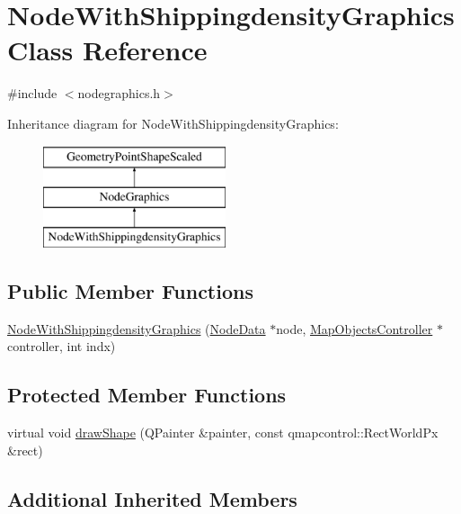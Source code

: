 \hypertarget{class_node_with_shippingdensity_graphics}{}\section{Node\+With\+Shippingdensity\+Graphics Class Reference}
\label{class_node_with_shippingdensity_graphics}


{\ttfamily \#include $<$nodegraphics.\+h$>$}

Inheritance diagram for Node\+With\+Shippingdensity\+Graphics\+:\begin{figure}[H]
\begin{center}
\leavevmode
\includegraphics[height=3.000000cm]{db/d8f/class_node_with_shippingdensity_graphics}
\end{center}
\end{figure}
\subsection*{Public Member Functions}
\begin{DoxyCompactItemize}
\item 
\mbox{\hyperlink{class_node_with_shippingdensity_graphics_a4d7c6832d200e767036f8f99c667c0b9}{Node\+With\+Shippingdensity\+Graphics}} (\mbox{\hyperlink{class_node_data}{Node\+Data}} $\ast$node, \mbox{\hyperlink{class_map_objects_controller}{Map\+Objects\+Controller}} $\ast$controller, int indx)
\end{DoxyCompactItemize}
\subsection*{Protected Member Functions}
\begin{DoxyCompactItemize}
\item 
virtual void \mbox{\hyperlink{class_node_with_shippingdensity_graphics_abf3585be954f535699f24e22df8e1236}{draw\+Shape}} (Q\+Painter \&painter, const qmapcontrol\+::\+Rect\+World\+Px \&rect)
\end{DoxyCompactItemize}
\subsection*{Additional Inherited Members}


